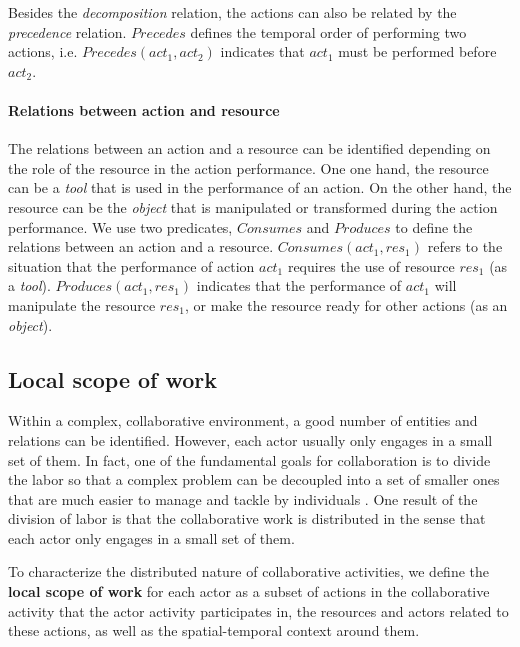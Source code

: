 Besides the \emph{decomposition} relation, the actions can also be related by the \emph{precedence} relation. $Precedes$ defines the temporal order of performing two actions, i.e. $Precedes(act_1, act_2)$ indicates that $act_1$ must be performed before $act_2$. 

\paragraph*{Relations between action and resource} %
\label{par:relations_between_action_and_resource}
The relations between an action and a resource can be identified depending on the role of the resource in the action performance. One one hand, the resource can be a \emph{tool} that is used in the performance of an action. On the other hand, the resource can be the \emph{object} that is manipulated or transformed during the action performance. We use two predicates, $Consumes$ and $Produces$ to define the relations between an action and a resource. $Consumes(act_1, res_1)$ refers to the situation that the performance of action $act_1$ requires the use of resource $res_1$  (as a \emph{tool}). $Produces(act_1, res_1)$ indicates that the performance of $act_1$ will manipulate the resource $res_1$, or make the resource ready for other actions (as an \emph{object}).

\subsection{Local scope of work} %
\label{sub:local_scope_of_work}
Within a complex, collaborative environment, a good number of entities and relations can be identified. However, each actor usually only engages in a small set of them. In fact, one of the fundamental goals for collaboration is to divide the labor so that a complex problem can be decoupled into a set of smaller ones that are much easier to manage and tackle by individuals \cite{schmidt1992taking}. One result of the division of labor is that the collaborative work is distributed in the sense that each actor only engages in a small set of them. 

To characterize the distributed nature of collaborative activities, we define the \textbf{local scope of work} for each actor as a subset of actions in the collaborative activity that the actor activity participates in, the resources and actors related to these actions, as well as the spatial-temporal context around them. 

